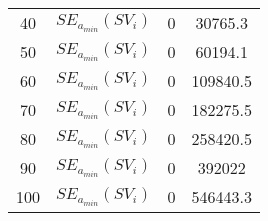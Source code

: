 \begin{table}[H]
\begin{tabular}{cc|cc}
40                                                          & $SE_{a_{min}}(SV_i)$                                                           & 0                                                             & 30765.3                                                               \\
50                                                          & $SE_{a_{min}}(SV_i)$                                                           & 0                                                             & 60194.1                                                               \\
60                                                          & $SE_{a_{min}}(SV_i)$                                                           & 0                                                             & 109840.5                                                              \\
70                                                          & $SE_{a_{min}}(SV_i)$                                                           & 0                                                             & 182275.5                                                              \\
80                                                          & $SE_{a_{min}}(SV_i)$                                                           & 0                                                             & 258420.5                                                              \\
90                                                          & $SE_{a_{min}}(SV_i)$                                                           & 0                                                             & 392022                                                                \\
100                                                         & $SE_{a_{min}}(SV_i)$                                                           & 0                                                             & 546443.3                                                             
\end{tabular}
\end{table}

